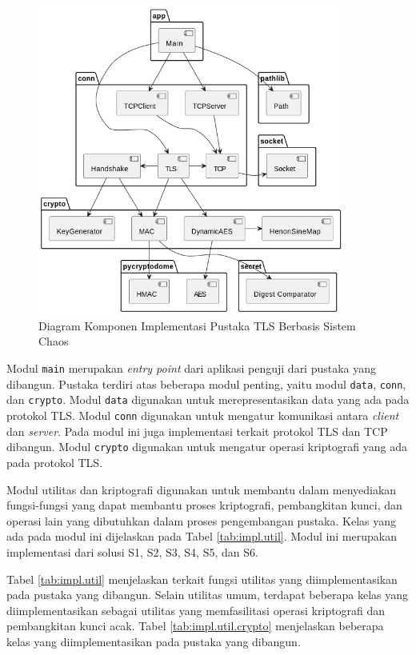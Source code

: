 \begin{figure}[!h]
  \centering
  \includegraphics[width=0.9\textwidth]{chapters/res/chapter-4/impl.component.png}
  \caption{Diagram Komponen Implementasi Pustaka TLS Berbasis Sistem Chaos} \label{fig:impl.overview}
\end{figure}

Modul \texttt{main} merupakan \emph{entry point} dari aplikasi penguji dari pustaka yang dibangun. Pustaka terdiri atas beberapa modul penting, yaitu modul \texttt{data}, \texttt{conn}, dan \texttt{crypto}. Modul \texttt{data} digunakan untuk merepresentasikan data yang ada pada protokol TLS. Modul \texttt{conn} digunakan untuk mengatur komunikasi antara \emph{client} dan \emph{server}. Pada modul ini juga implementasi terkait protokol TLS dan TCP dibangun. Modul \texttt{crypto} digunakan untuk mengatur operasi kriptografi yang ada pada protokol TLS. 

Modul utilitas dan kriptografi digunakan untuk membantu dalam menyediakan fungsi-fungsi yang dapat membantu proses kriptografi, pembangkitan kunci, dan operasi lain yang dibutuhkan dalam proses pengembangan pustaka. Kelas yang ada pada modul ini dijelaskan pada Tabel \ref{tab:impl.util}. Modul ini merupakan implementasi dari solusi S1, S2, S3, S4, S5, dan S6.

Tabel \ref{tab:impl.util} menjelaskan terkait fungsi utilitas yang diimplementasikan pada pustaka yang dibangun. Selain utilitas umum, terdapat beberapa kelas yang diimplementasikan sebagai utilitas yang memfasilitasi operasi kriptografi dan pembangkitan kunci acak. Tabel \ref{tab:impl.util.crypto} menjelaskan beberapa kelas yang diimplementasikan pada pustaka yang dibangun. 

